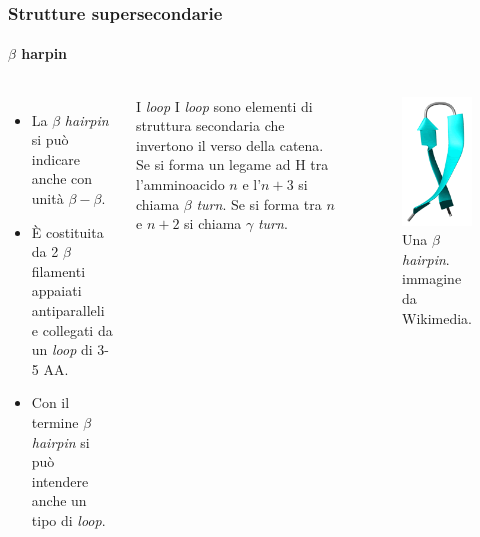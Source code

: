 \documentclass{beamer}
\begin{document}
\begin{frame}
 \frametitle{Strutture supersecondarie}
  \framesubtitle{$\beta$ harpin}
\begin{columns}
      
\begin{itemize}
 \item La $\beta$ \emph{hairpin} si può indicare anche con unità $\beta - \beta$.
\pause  \item È costituita da 2 $\beta$ filamenti appaiati antiparalleli e collegati da un \emph{loop} di 3-5 AA.
\pause  \item Con il termine $\beta$ \emph{hairpin} si può intendere anche un tipo di \emph{loop}.
\end{itemize}
\pause   \begin{beamerboxesrounded}[upper=uppercolor, lower=lowercolor, shadow=true]
    {I \emph{loop}}
    I \emph{loop} sono elementi di struttura secondaria che invertono il verso della catena. Se si forma un legame ad H tra l'amminoacido $n$ e l'$n+3$ si chiama $\beta$ \emph{turn}. Se si forma tra $n$ e $n+2$ si chiama $\gamma$ \emph{turn}. 
  \end{beamerboxesrounded}
\vskip -10pt
\begin{figure}\includegraphics[scale=0.25]{beta_hairpin.png}\caption{Una $\beta$ \emph{hairpin}. \tiny{immagine da Wikimedia.}}\end{figure}  
  \end{columns}
\end{frame}
\end{document}
